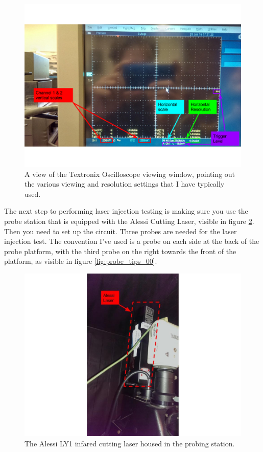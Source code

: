\documentclass{report}
\begin{document}
            \begin{figure}[h] 
                \includegraphics[height=.4\textheight]{oscilloscope_00}
                \centering
                \caption{ A view of the Textronix Oscilloscope viewing window, pointing out the various viewing and resolution settings that I have typically used. }
                \label{fig:oscilloscope_00}
            \end{figure}


            The next step to performing laser injection testing is making sure you use the probe station that is equipped with the Alessi Cutting Laser, visible in figure \ref{fig:laser_02}. Then you need to set up the circuit. Three probes are needed for the laser injection test. The convention I've used is a probe on each side at the back of the probe platform, with the third probe on the right towards the front of the platform, as visible in figure \ref{fig:probe_tips_00}.

            \begin{figure}[h] 
                \includegraphics[height=.4\textheight]{laser_02}
                \centering
                \caption{ The Alessi LY1 infared cutting laser housed in the probing station. }
                \label{fig:laser_02}
            \end{figure}
\end{document}
